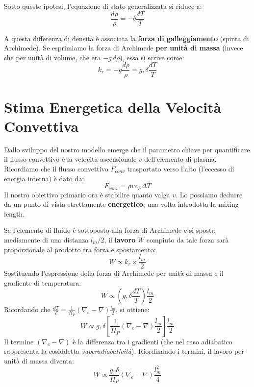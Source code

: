 Sotto queste ipotesi, l'equazione di stato generalizzata si riduce a:
\begin{equation}
\frac{d\rho}{\rho} = - \delta \frac{dT}{T}
\end{equation}

A questa differenza di densità è associata la \textbf{forza di galleggiamento} (spinta di Archimede). Se esprimiamo la forza di Archimede \textbf{per unità di massa} (invece che per unità di volume, che era $-g \, d\rho$), essa si scrive come:
\begin{equation}
k_r = - g \frac{d\rho}{\rho} = g , \delta \frac{dT}{T}
\end{equation}

\section{Stima Energetica della Velocità Convettiva}

Dallo sviluppo del nostro modello emerge che il parametro chiave per quantificare il flusso convettivo è la velocità ascensionale $v$ dell'elemento di plasma.
Ricordiamo che il flusso convettivo $F_{conv}$ trasportato verso l'alto (l'eccesso di energia interna) è dato da:
\begin{equation}
F_{conv} = \rho v c_P \Delta T
\end{equation}
Il nostro obiettivo primario ora è stabilire quanto valga $v$. Lo possiamo dedurre da un punto di vista strettamente \textbf{energetico}, una volta introdotta la mixing length.

Se l'elemento di fluido è sottoposto alla forza di Archimede e si sposta mediamente di una distanza $l_m/2$, il \textbf{lavoro} $W$ compiuto da tale forza sarà proporzionale al prodotto tra forza e spostamento:
\begin{equation}
W \propto k_r \times \frac{l_m}{2}
\end{equation}
Sostituendo l'espressione della forza di Archimede per unità di massa e il gradiente di temperatura:
\begin{equation}
W \propto \left( g , \delta \frac{dT}{T} \right) \frac{l_m}{2}
\end{equation}
Ricordando che $\frac{dT}{T} = \frac{1}{H_P} (\nabla_e - \nabla) \frac{l_m}{2}$, si ottiene:
\begin{equation}
W \propto g , \delta \left[ \frac{1}{H_P} (\nabla_e - \nabla) \frac{l_m}{2} \right] \frac{l_m}{2}
\end{equation}
Il termine $(\nabla_e - \nabla)$ è la differenza tra i gradienti (che nel caso adiabatico rappresenta la cosiddetta \textit{superadiabaticità}). Riordinando i termini, il lavoro per unità di massa diventa:
\begin{equation}
W \propto \frac{g , \delta}{H_P} (\nabla_e - \nabla) \frac{l_m^2}{4}
\end{equation}


